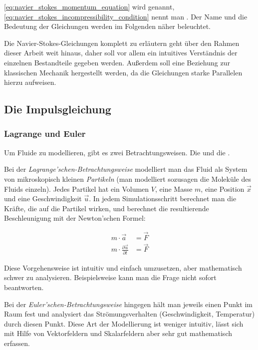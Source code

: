 \autoref{eq:navier_stokes_momentum_equation} wird
 genannt,
\autoref{eq:navier_stokes_incompressibility_condition} nennt man
. Der Name und die Bedeutung der
Gleichungen werden im Folgenden näher beleuchtet.

Die Navier-Stokes-Gleichungen komplett zu erläutern geht über den Rahmen dieser
Arbeit weit hinaus, daher soll vor allem ein intuitives Verständnis der
einzelnen Bestandteile gegeben werden. Außerdem soll eine Beziehung zur
klassischen Mechanik hergestellt werden, da die Gleichungen starke Parallelen
hierzu aufweisen.

\subsection{Die Impulsgleichung}

\subsubsection{Lagrange und Euler}

Um Fluide zu modellieren, gibt es zwei Betrachtungsweisen. Die
 und die
.

Bei der \emph{Lagrange'schen-Betrachtungsweise} modelliert man das Fluid als System
von mikroskopisch kleinen \emph{Partikeln} (man modelliert sozusagen die
Moleküle des Fluids einzeln). Jedes Partikel hat ein Volumen $V$, eine
Masse $m$, eine Position $\vec{x}$ und eine Geschwindigkeit $\vec{u}$. In jedem
Simulationsschritt berechnet man die Kräfte, die auf die Partikel wirken, und
berechnet die resultierende Beschleunigung mit der Newton'schen Formel:

\begin{align*}
m \cdot \vec{a} &= \vec{F} \\
m \cdot \frac{\partial \vec{u}}{\partial t} &= \vec{F}
\end{align*}

Diese Vorgehensweise ist intuitiv und einfach umzusetzen, aber mathematisch
schwer zu analysieren. Beispielsweise kann man die Frage  nicht sofort
beantworten.

Bei der \emph{Euler'schen-Betrachtungsweise} hingegen hält man jeweils einen Punkt im
Raum fest und analysiert das Strömungsverhalten (Geschwindigkeit, Temperatur)
durch diesen Punkt. Diese Art der Modellierung ist weniger intuitiv, lässt sich
mit Hilfe von Vektorfeldern und Skalarfeldern aber sehr gut mathematisch erfassen.

